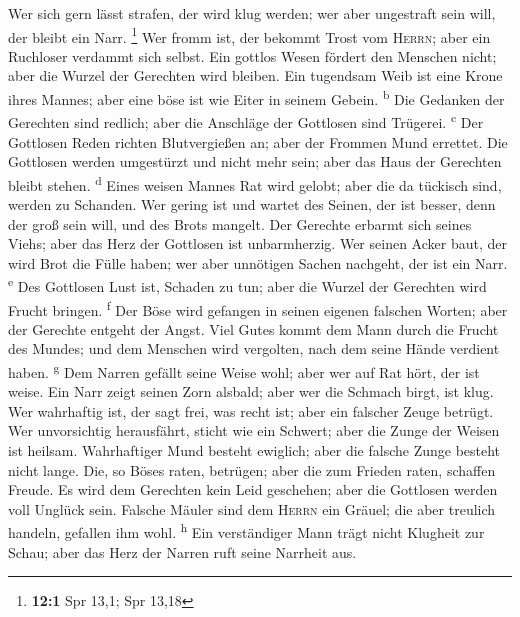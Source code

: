  Wer sich gern lässt strafen, der wird klug werden; wer
aber ungestraft sein will, der bleibt ein Narr. \footnote{\textbf{12:1}
  Spr 13,1; Spr 13,18}  Wer fromm ist, der bekommt Trost
vom \textsc{Herrn}; aber ein Ruchloser verdammt sich selbst.
 Ein gottlos Wesen fördert den Menschen nicht; aber die
Wurzel der Gerechten wird bleiben.  Ein tugendsam Weib ist
eine Krone ihres Mannes; aber eine böse ist wie Eiter in seinem Gebein.
\textsuperscript{b}  Die Gedanken der Gerechten sind
redlich; aber die Anschläge der Gottlosen sind Trügerei.
\textsuperscript{c}  Der Gottlosen Reden richten
Blutvergießen an; aber der Frommen Mund errettet.  Die
Gottlosen werden umgestürzt und nicht mehr sein; aber das Haus der
Gerechten bleibt stehen. \textsuperscript{d}  Eines weisen
Mannes Rat wird gelobt; aber die da tückisch sind, werden zu Schanden.
 Wer gering ist und wartet des Seinen, der ist besser,
denn der groß sein will, und des Brots mangelt.  Der
Gerechte erbarmt sich seines Viehs; aber das Herz der Gottlosen ist
unbarmherzig.  Wer seinen Acker baut, der wird Brot die
Fülle haben; wer aber unnötigen Sachen nachgeht, der ist ein Narr.
\textsuperscript{e}  Des Gottlosen Lust ist, Schaden zu
tun; aber die Wurzel der Gerechten wird Frucht bringen.
\textsuperscript{f}  Der Böse wird gefangen in seinen
eigenen falschen Worten; aber der Gerechte entgeht der Angst.
 Viel Gutes kommt dem Mann durch die Frucht des Mundes;
und dem Menschen wird vergolten, nach dem seine Hände verdient haben.
\textsuperscript{g}  Dem Narren gefällt seine Weise wohl;
aber wer auf Rat hört, der ist weise.  Ein Narr zeigt
seinen Zorn alsbald; aber wer die Schmach birgt, ist klug.
 Wer wahrhaftig ist, der sagt frei, was recht ist; aber
ein falscher Zeuge betrügt.  Wer unvorsichtig
herausfährt, sticht wie ein Schwert; aber die Zunge der Weisen ist
heilsam.  Wahrhaftiger Mund besteht ewiglich; aber die
falsche Zunge besteht nicht lange.  Die, so Böses raten,
betrügen; aber die zum Frieden raten, schaffen Freude. 
Es wird dem Gerechten kein Leid geschehen; aber die Gottlosen werden
voll Unglück sein.  Falsche Mäuler sind dem
\textsc{Herrn} ein Gräuel; die aber treulich handeln, gefallen ihm wohl.
\textsuperscript{h}  Ein verständiger Mann trägt nicht
Klugheit zur Schau; aber das Herz der Narren ruft seine Narrheit aus.
